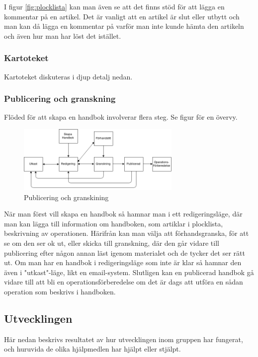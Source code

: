 I figur \ref{fig:plocklista} kan man även se att det finns stöd för att lägga en kommentar på en artikel.
Det är vanligt att en artikel är slut eller utbytt och man kan då lägga en kommentar på varför man inte kunde hämta den artikeln och även hur man har löst det istället.

\subsubsection{Kartoteket}
Kartoteket diskuteras i djup detalj nedan.

\subsubsection{Publicering och granskning}
Flöded för att skapa en handbok involverar flera steg.
Se figur för en övervy.

\begin{figure}
  \centering
  \includegraphics[width=0.7\textwidth]{images/site/model}
  \caption{Publicering och granskining}
  \label{fig:model}
\end{figure}

När man först vill skapa en handbok så hamnar man i ett redigeringsläge,
där man kan lägga till information om handboken, som artiklar i plocklista,
beskrivning av operationen.
Härifrån kan man välja att förhandsgranska, för att se om den ser ok ut,
eller skicka till granskning, där den går vidare till publicering
efter någon annan läst igenom materialet och de tycker det ser rätt ut.
Om man har en handbok i redigeringsläge som inte är klar så hamnar den även i
"utkast"-läge, likt en email-system.
Slutligen kan en publicerad handbok gå vidare till att bli en
operationsförberedelse om det är dags att utföra en sådan operation
som beskrivs i handboken.

\subsection{Utvecklingen}
Här nedan beskrivs resultatet av hur utvecklingen inom gruppen har fungerat,
och huruvida de olika hjälpmedlen har hjälpt eller stjälpt.

